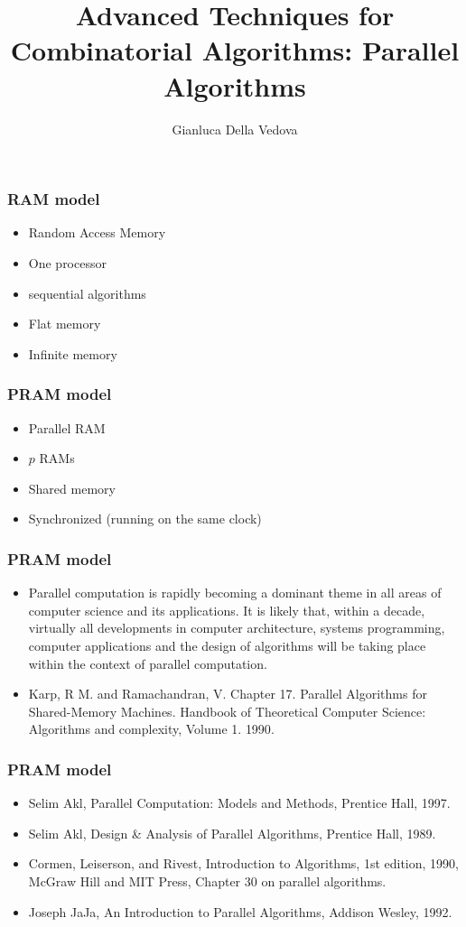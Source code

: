 \documentclass[12pt,aspectratio=169]{beamer}
\author{Gianluca Della Vedova}
\title[Advanced Algorithms]{Advanced Techniques for Combinatorial Algorithms:
Parallel Algorithms}
\institute[]{Univ. Milano -- Bicocca\\
  \texttt{https://gianluca.dellavedova.org}}
\begin{document}
\begin{frame}
  \titlepage
\end{frame}





\begin{frame}\frametitle{RAM model}
  \begin{itemize}
  \item
    Random Access Memory
  \item
    One processor
  \item
    sequential algorithms
  \item
    Flat memory
  \item
    Infinite memory
  \end{itemize}
\end{frame}

\begin{frame}\frametitle{PRAM model}
  \begin{itemize}
  \item
    \alert{Parallel} RAM
  \item
    $p$ RAMs
  \item
    Shared memory
  \item
    Synchronized (running on the same clock)
  \end{itemize}
\end{frame}

\begin{frame}\frametitle{PRAM model}
  \begin{itemize}
  \item
Parallel computation is \alert{rapidly} becoming a \alert{dominant} theme in all areas of
computer science and its applications.
It is likely that, \alert{within a decade}, virtually all developments in computer
architecture, systems programming, computer applications and the design of
algorithms will be taking place within the context of parallel computation.
\item
\small  Karp, R M. and Ramachandran, V. Chapter 17. Parallel Algorithms for
  Shared-Memory Machines. Handbook of Theoretical Computer Science: Algorithms and complexity, Volume 1.
 \alert{1990}.
\end{itemize}
\end{frame}


\begin{frame}\frametitle{PRAM model}
  \begin{itemize}[<.->]
    \item
Selim Akl, Parallel Computation: Models and Methods, Prentice Hall, 1997.    
    \item
Selim Akl, Design \& Analysis of Parallel Algorithms, Prentice Hall, 1989.
    \item
Cormen, Leiserson, and Rivest, Introduction to Algorithms, 1st edition,
1990, McGraw Hill and MIT Press, Chapter 30 on parallel algorithms.
    \item
Joseph JaJa, An Introduction to Parallel Algorithms, Addison Wesley, 1992.
\end{itemize}
\end{frame}
\end{document}
